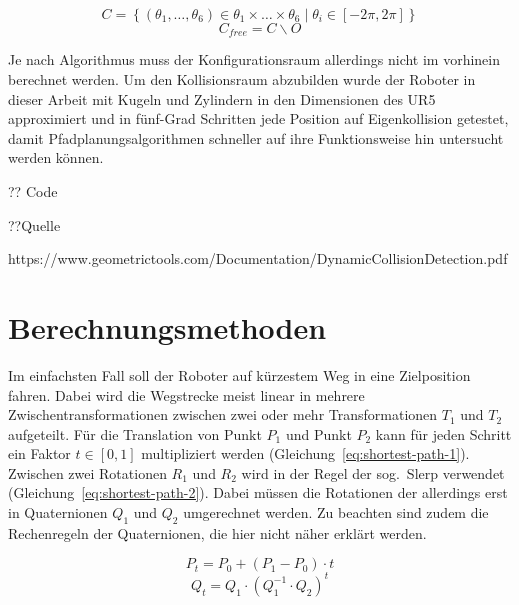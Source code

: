 \begin{equation}
    \mathit{C} = \left\{ \left( \theta_1,\dots,\theta_6 \right) \in \theta_1\times\dots\times\theta_6 \mid \theta_i \in \left[ -2\pi, 2\pi \right]\right\}
    \label{eq:config-1}
\end{equation}
\begin{equation}
    \mathit{C}_{free} = \mathit{C}\backslash\mathit{O}
    \label{eq:config-2}
\end{equation}

Je nach Algorithmus muss der Konfigurationsraum allerdings nicht im vorhinein berechnet werden.
Um den Kollisionsraum abzubilden wurde der Roboter in dieser Arbeit mit Kugeln und Zylindern in den Dimensionen des UR5 approximiert und in fünf-Grad Schritten jede Position auf Eigenkollision getestet, damit Pfadplanungsalgorithmen schneller auf ihre Funktionsweise hin untersucht werden können.

?? Code

??Quelle

https://www.geometrictools.com/Documentation/DynamicCollisionDetection.pdf


\section{Berechnungsmethoden}
%
Im einfachsten Fall soll der Roboter auf kürzestem Weg in eine Zielposition fahren.
Dabei wird die Wegstrecke meist linear in mehrere Zwischentransformationen zwischen zwei oder mehr Transformationen $T_1$ und $T_2$ aufgeteilt.
Für die Translation von Punkt $P_1$ und Punkt $P_2$ kann für jeden Schritt ein Faktor $t \in \left[0,1\right]$ multipliziert werden (Gleichung~\ref{eq:shortest-path-1}).
Zwischen zwei Rotationen $R_1$ und $R_2$ wird in der Regel der sog.\ Slerp verwendet (Gleichung~\ref{eq:shortest-path-2}).
Dabei müssen die Rotationen der allerdings erst in Quaternionen $Q_1$ und $Q_2$ umgerechnet werden.
Zu beachten sind zudem die Rechenregeln der Quaternionen, die hier nicht näher erklärt werden.

\begin{equation}
    P_{t} = P_0 + \left( P_1 - P_0 \right) \cdot t
    \label{eq:shortest-path-1}
\end{equation}
\begin{equation}
    Q_{t} = Q_1 \cdot \left( Q_1^{-1} \cdot Q_2 \right)^t
    \label{eq:shortest-path-2}
\end{equation}

